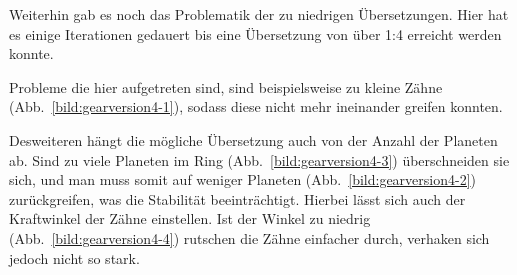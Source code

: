 Weiterhin gab es noch das Problematik der zu niedrigen Übersetzungen. 
Hier hat es einige Iterationen gedauert bis eine Übersetzung von über 1:4 erreicht werden konnte.

Probleme die hier aufgetreten sind, sind beispielsweise zu kleine Zähne (Abb.~\ref{bild:gearversion4-1}), sodass diese nicht mehr ineinander greifen konnten.

Desweiteren hängt die mögliche Übersetzung auch von der Anzahl der Planeten ab. 
Sind zu viele Planeten im Ring (Abb.~\ref{bild:gearversion4-3}) überschneiden sie sich, und man muss somit auf weniger Planeten (Abb.~\ref{bild:gearversion4-2}) zurückgreifen, was die Stabilität beeinträchtigt.
Hierbei lässt sich auch der Kraftwinkel der Zähne einstellen. 
Ist der Winkel zu niedrig (Abb.~\ref{bild:gearversion4-4}) rutschen die Zähne einfacher durch, verhaken sich jedoch nicht so stark.

